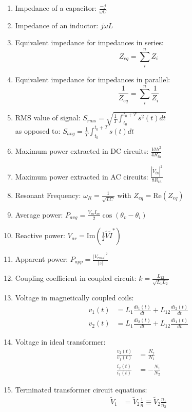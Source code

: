 \documentclass[twocolumn]{article}
\begin{document}
\begin{enumerate}
    \item Impedance of a capacitor: $\frac{-j}{\omega C}$
    \item Impedance of an inductor: $j \omega L$
    \item Equivalent impedance for impedances in series: 
    \[Z_{eq} = \sum_{i}^{n} Z_i\]
    \item Equivalent impedance for impedances in parallel: 
    \[\frac{1}{Z_{eq}} = \sum_{i}^{n} \frac{1}{Z_i}\]
    \item RMS value of signal: $S_{rms} = \sqrt{\frac{1}{T}\int_{t_0}^{t_0+T} s^2(t) dt}$\\as opposed to: \hspace{1cm}$S_{avg}=\frac{1}{T}\int_{t_0}^{t_0+T} s(t) dt$
    \item Maximum power extracted in DC circuits: $\frac{V{th}^2}{4R_{th}}$
    \item Maximum power extracted in AC circuits: $\frac{|\tilde{V}_{th}|^2}{8R_{th}}$
    \item Resonant Frequency: $\omega_R = \frac{1}{\sqrt{LC}}$ with $Z_{eq}=\text{Re}(Z_{eq})$
    \item Average power: $P_{avg} = \frac{V_m I_m}{2}\cos{(\theta_v - \theta_i)}$
    \item Reactive power: $V_{ar} = \text{Im}(\frac{1}{2}\tilde{V}\tilde{I}^*)$
    \item Apparent power: $P_{app} = \frac{|V_{rms}|^2}{|z|}$
    \item Coupling coefficient in coupled circuit: $k = \frac{L_{12}}{\sqrt{L_1 L_2}}$
    \item Voltage in magnetically coupled coils: 
    \begin{align*}
        v_{1}(t) &= L_1 \frac{di_1(t)}{dt} + L_{12}\frac{di_2(t)}{dt} \\
        v_{2}(t) &= L_1 \frac{di_2(t)}{dt} + L_{12}\frac{di_1(t)}{dt} 
    \end{align*}
    \item Voltage in ideal transformer: 
    \begin{align*}
        \frac{v_2(t)}{v_1(t)} &= \frac{N_2}{N_1} \\
        \frac{i_2(t)}{i_1(t)} &= -\frac{N_1}{N_2}   
    \end{align*}
    \item Terminated transformer circuit equations: 
    \begin{align*}
        \tilde{V}_1 &= \tilde{V}_2\frac{1}{n}\equiv\tilde{V}_2\frac{n_1}{n_2}  \\

\end{align*}
\end{enumerate}
\end{document}
